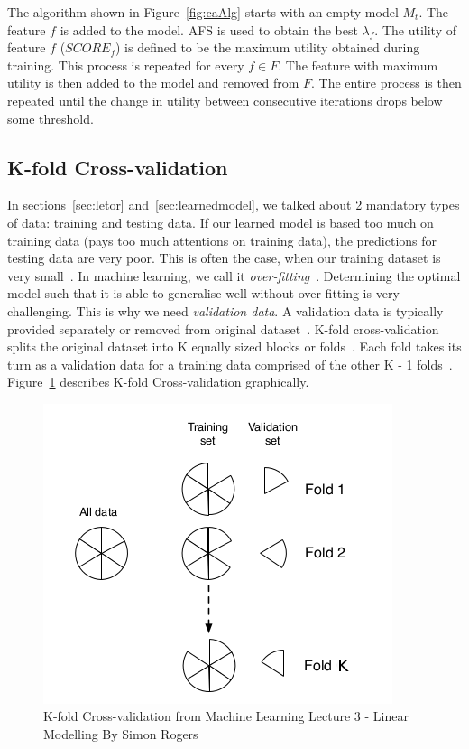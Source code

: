 
The algorithm shown in Figure~\ref{fig:caAlg} starts with an empty model $M_t$. The feature $f$ is added to the model. AFS is used to 
obtain the best $\lambda_f$. The utility of feature $f$ ($SCORE_f$) is defined to be the maximum utility obtained during training. This process 
is repeated for every $f \in F$. The feature with maximum utility is then added to the model and removed from $F$. 
The entire
process is then repeated until the change
in utility between consecutive iterations drops below some
threshold.

\subsection{K-fold Cross-validation}\label{sec:kfold}
In sections~\ref{sec:letor} and~\ref{sec:learnedmodel}, we talked about 2 mandatory types of data: training and testing data. If our learned model is based too much on 
training data (pays too much attentions on training data), the predictions for testing data are very poor. This is often the case, when our training dataset
is very small~\cite{mlSimon}. In machine learning, we call 
it \textit{over-fitting}~\cite[P. 28]{mlSimon}. Determining the optimal model such that it is able to generalise well without over-fitting is very challenging.
This is why we need \textit{validation data}. A validation data is typically provided separately or removed from original dataset~\cite{craig}.
K-fold cross-validation splits the original dataset into K equally sized blocks or folds~\cite{mlSimon}. Each fold takes its turn as a validation data for a
training data comprised of the other K - 1 folds~\cite{mlSimon}. Figure~\ref{fig:crossvalidation} describes K-fold Cross-validation graphically.
\begin{figure}
\centering
\includegraphics[scale=0.4]{./figures/validation.png}
\caption{K-fold Cross-validation from Machine Learning Lecture 3 - Linear Modelling By Simon Rogers}\label{fig:crossvalidation} 
\end{figure}

